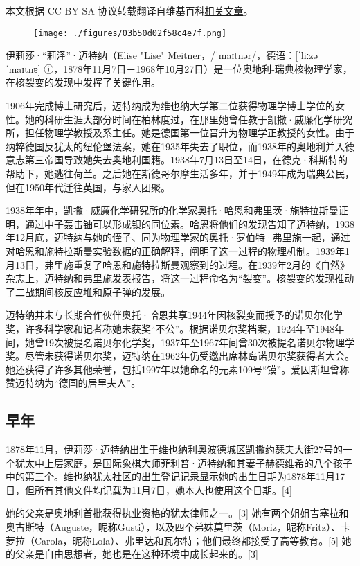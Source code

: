 
本文根据 CC-BY-SA 协议转载翻译自维基百科\href{https://en.wikipedia.org/wiki/Lise_Meitner}{相关文章}。

\begin{figure}[ht]
\centering
\texttt{[image: ./figures/03b50d02f58c4e7f.png]}
\caption{} \label{fig_LZm_1}
\end{figure}
伊莉莎·“莉泽”·迈特纳（Elise "Lise" Meitner，/ˈmaɪtnər/，德语：[ˈliːzə ˈmaɪtnɐ] ⓘ，1878年11月7日－1968年10月27日）是一位奥地利-瑞典核物理学家，在核裂变的发现中发挥了关键作用。

1906年完成博士研究后，迈特纳成为维也纳大学第二位获得物理学博士学位的女性。她的科研生涯大部分时间在柏林度过，在那里她曾任教于凯撒·威廉化学研究所，担任物理学教授及系主任。她是德国第一位晋升为物理学正教授的女性。由于纳粹德国反犹太的纽伦堡法案，她在1935年失去了职位，而1938年的奥地利并入德意志第三帝国导致她失去奥地利国籍。1938年7月13日至14日，在德克·科斯特的帮助下，她逃往荷兰。之后她在斯德哥尔摩生活多年，并于1949年成为瑞典公民，但在1950年代迁往英国，与家人团聚。

1938年年中，凯撒·威廉化学研究所的化学家奥托·哈恩和弗里茨·施特拉斯曼证明，通过中子轰击铀可以形成钡的同位素。哈恩将他们的发现告知了迈特纳，1938年12月底，迈特纳与她的侄子、同为物理学家的奥托·罗伯特·弗里施一起，通过对哈恩和施特拉斯曼实验数据的正确解释，阐明了这一过程的物理机制。1939年1月13日，弗里施重复了哈恩和施特拉斯曼观察到的过程。在1939年2月的《自然》杂志上，迈特纳和弗里施发表报告，将这一过程命名为“裂变”。核裂变的发现推动了二战期间核反应堆和原子弹的发展。

迈特纳并未与长期合作伙伴奥托·哈恩共享1944年因核裂变而授予的诺贝尔化学奖，许多科学家和记者称她未获奖“不公”。根据诺贝尔奖档案，1924年至1948年间，她曾19次被提名诺贝尔化学奖，1937年至1967年间曾30次被提名诺贝尔物理学奖。尽管未获得诺贝尔奖，迈特纳在1962年仍受邀出席林岛诺贝尔奖获得者大会。她还获得了许多其他荣誉，包括1997年以她命名的元素109号“镆”。爱因斯坦曾称赞迈特纳为“德国的居里夫人”。
\subsection{早年}
1878年11月，伊莉莎·迈特纳出生于维也纳利奥波德城区凯撒约瑟夫大街27号的一个犹太中上层家庭，是国际象棋大师菲利普·迈特纳和其妻子赫德维希的八个孩子中的第三个。维也纳犹太社区的出生登记记录显示她的出生日期为1878年11月17日，但所有其他文件均记载为11月7日，她本人也使用这个日期。[4]

她的父亲是奥地利首批获得执业资格的犹太律师之一。[3] 她有两个姐姐吉塞拉和奥古斯特（Auguste，昵称Gusti），以及四个弟妹莫里茨（Moriz，昵称Fritz）、卡萝拉（Carola，昵称Lola）、弗里达和瓦尔特；他们最终都接受了高等教育。[5] 她的父亲是自由思想者，她也是在这种环境中成长起来的。[3]

